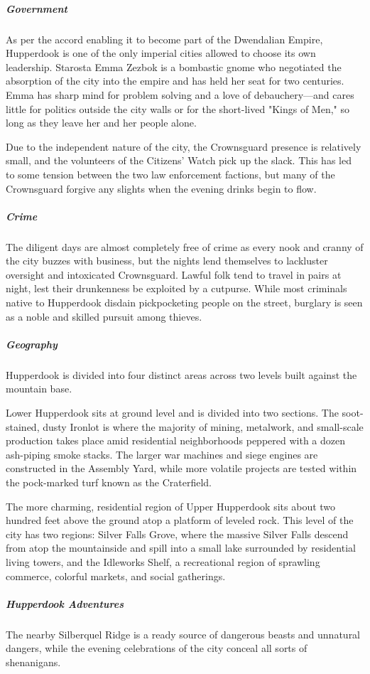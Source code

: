 \documentclass[10pt,a4paper,twoside,bg=print,twocolumn,openany,nodeprecatedcode]{dndbook}
\begin{document}
\subparagraph{Government}
As per the accord enabling it to become part of the Dwendalian Empire, Hupperdook is one of the only imperial cities allowed to choose its own leadership. Starosta Emma Zezbok is a bombastic gnome who negotiated the absorption of the city into the empire and has held her seat for two centuries. Emma has sharp mind for problem solving and a love of debauchery—and cares little for politics outside the city walls or for the short-lived "Kings of Men," so long as they leave her and her people alone.

Due to the independent nature of the city, the Crownsguard presence is relatively small, and the volunteers of the Citizens' Watch pick up the slack. This has led to some tension between the two law enforcement factions, but many of the Crownsguard forgive any slights when the evening drinks begin to flow.

\subparagraph{Crime}
The diligent days are almost completely free of crime as every nook and cranny of the city buzzes with business, but the nights lend themselves to lackluster oversight and intoxicated Crownsguard. Lawful folk tend to travel in pairs at night, lest their drunkenness be exploited by a cutpurse. While most criminals native to Hupperdook disdain pickpocketing people on the street, burglary is seen as a noble and skilled pursuit among thieves.

\subparagraph{Geography}
Hupperdook is divided into four distinct areas across two levels built against the mountain base.

Lower Hupperdook sits at ground level and is divided into two sections. The soot-stained, dusty Ironlot is where the majority of mining, metalwork, and small-scale production takes place amid residential neighborhoods peppered with a dozen ash-piping smoke stacks. The larger war machines and siege engines are constructed in the Assembly Yard, while more volatile projects are tested within the pock-marked turf known as the Craterfield.

The more charming, residential region of Upper Hupperdook sits about two hundred feet above the ground atop a platform of leveled rock. This level of the city has two regions: Silver Falls Grove, where the massive Silver Falls descend from atop the mountainside and spill into a small lake surrounded by residential living towers, and the Idleworks Shelf, a recreational region of sprawling commerce, colorful markets, and social gatherings.

\subparagraph{Hupperdook Adventures}
The nearby Silberquel Ridge is a ready source of dangerous beasts and unnatural dangers, while the evening celebrations of the city conceal all sorts of shenanigans.
\end{document}
